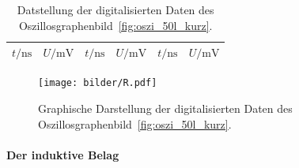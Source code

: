 \begin{table}[hb]
  \centering
  \begin{tabular}{cc|cc|cc}
    \midrule
    \midrule
    $t / \si{\nano\second}$ & $U / \si{\milli\volt}$ &
    $t / \si{\nano\second}$ & $U / \si{\milli\volt}$ &
    $t / \si{\nano\second}$ & $U / \si{\milli\volt}$ \\
    \midrule
    
    \midrule
    \midrule
  \end{tabular}
  \caption{Datstellung der digitalisierten Daten des
    Oszillosgraphenbild~\ref{fig:oszi_50l_kurz}.}
  \label{tab:R_Daten}
\end{table}
\begin{figure}[hb]
  \centering
  \texttt{[image: bilder/R.pdf]}
  \caption{Graphische Darstellung der digitalisierten Daten des
    Oszillosgraphenbild~\ref{fig:oszi_50l_kurz}.}
\label{fig:R_Daten}
\end{figure}

\clearpage
\paragraph{Der induktive Belag}
\label{par:der_induktive_belag}

